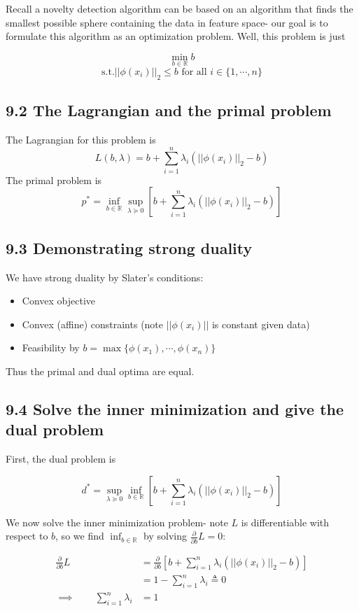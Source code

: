\documentclass[paper=a4, fontsize=11pt]{scrartcl} %
\numberwithin{equation}{section} %
\numberwithin{figure}{section} %
\numberwithin{table}{section} %
\begin{document}
Recall a novelty detection algorithm can be based on an algorithm that finds the smallest possible sphere containing the data in feature space- our goal is to formulate this algorithm as an optimization problem. Well, this problem is just
\begin{center} \[\min_{b \in \mathbb{R}} b\]
\[\textrm{s.t.} ||\phi(x_i)||_2 \leq b \textrm{ for all } i \in \{1, \cdots, n\}\]
\end{center}

\subsection*{9.2 The Lagrangian and the primal problem}

The Lagrangian for this problem is
\[L(b, \lambda) = b+ \sum_{i=1}^n \lambda_i (||\phi(x_i)||_2 - b)\]
The primal problem is
\[p^* = \inf_{b \in \mathbb{R}} \sup_{\lambda \succeq 0} \left[ b+ \sum_{i=1}^n \lambda_i (||\phi(x_i)||_2 - b) \right]\]

\subsection*{9.3 Demonstrating strong duality}

We have strong duality by Slater's conditions:
\begin{itemize}
\item Convex objective
\item Convex (affine) constraints (note $||\phi(x_i)||$ is constant given data)
\item Feasibility by $b = \max \{ \phi(x_1), \cdots, \phi(x_n) \}$
\end{itemize}

Thus the primal and dual optima are equal.

\subsection*{9.4 Solve the inner minimization and give the dual problem}

First, the dual problem is

\[d^* =\sup_{\lambda \succeq 0}  \inf_{b \in \mathbb{R}} \left[ b+ \sum_{i=1}^n \lambda_i (||\phi(x_i)||_2 - b) \right]\]

We now solve the inner minimization problem- note $L$ is differentiable with respect to $b$, so we find $\inf_{b \in \mathbb{R}}$ by solving $\frac{\partial}{\partial b} L = 0$:

\begin{align*}
\frac{\partial}{\partial b} L &= \frac{\partial}{\partial b} \left[b+ \sum_{i=1}^n \lambda_i (||\phi(x_i)||_2 - b) \right] \\
	&= 1 - \sum_{i = 1}^n \lambda_i \triangleq 0 \\
	\implies \qquad{} \sum_{i = 1}^n \lambda_i &= 1
\end{align*}
\end{document}
